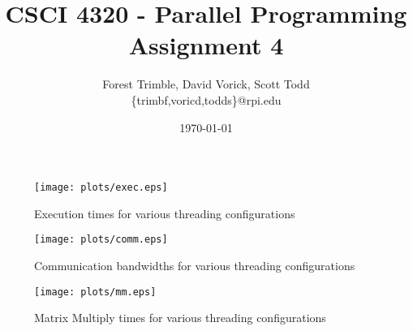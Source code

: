 \documentclass[twocolumn]{article}
\title{CSCI 4320 - Parallel Programming\\Assignment 4}
\author{Forest Trimble, David Vorick, Scott Todd\\\{trimbf,voricd,todds\}@rpi.edu}
\date{\today}
\begin{document}
\maketitle

\pagestyle{fancy}
\fancyhead{}
\fancyhead[R]{\today}

\begin{figure}
  \texttt{[image: plots/exec.eps]}
  \caption{Execution times for various threading configurations}
\end{figure}

\begin{figure}
  \texttt{[image: plots/comm.eps]}
  \caption{Communication bandwidths for various threading configurations}
\end{figure}

\begin{figure}
  \texttt{[image: plots/mm.eps]}
  \caption{Matrix Multiply times for various threading configurations}
\end{figure}
\end{document}
